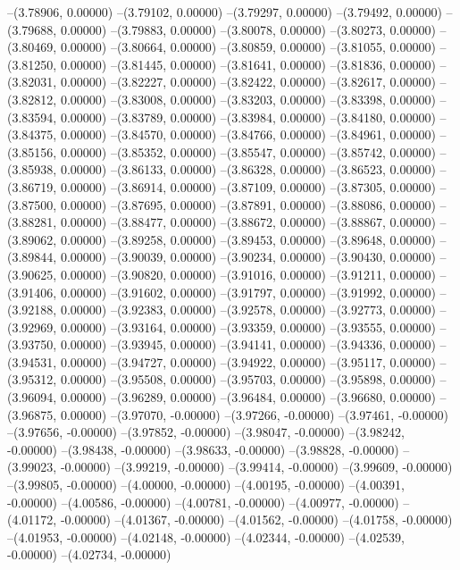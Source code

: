 --(3.78906, 0.00000)
--(3.79102, 0.00000)
--(3.79297, 0.00000)
--(3.79492, 0.00000)
--(3.79688, 0.00000)
--(3.79883, 0.00000)
--(3.80078, 0.00000)
--(3.80273, 0.00000)
--(3.80469, 0.00000)
--(3.80664, 0.00000)
--(3.80859, 0.00000)
--(3.81055, 0.00000)
--(3.81250, 0.00000)
--(3.81445, 0.00000)
--(3.81641, 0.00000)
--(3.81836, 0.00000)
--(3.82031, 0.00000)
--(3.82227, 0.00000)
--(3.82422, 0.00000)
--(3.82617, 0.00000)
--(3.82812, 0.00000)
--(3.83008, 0.00000)
--(3.83203, 0.00000)
--(3.83398, 0.00000)
--(3.83594, 0.00000)
--(3.83789, 0.00000)
--(3.83984, 0.00000)
--(3.84180, 0.00000)
--(3.84375, 0.00000)
--(3.84570, 0.00000)
--(3.84766, 0.00000)
--(3.84961, 0.00000)
--(3.85156, 0.00000)
--(3.85352, 0.00000)
--(3.85547, 0.00000)
--(3.85742, 0.00000)
--(3.85938, 0.00000)
--(3.86133, 0.00000)
--(3.86328, 0.00000)
--(3.86523, 0.00000)
--(3.86719, 0.00000)
--(3.86914, 0.00000)
--(3.87109, 0.00000)
--(3.87305, 0.00000)
--(3.87500, 0.00000)
--(3.87695, 0.00000)
--(3.87891, 0.00000)
--(3.88086, 0.00000)
--(3.88281, 0.00000)
--(3.88477, 0.00000)
--(3.88672, 0.00000)
--(3.88867, 0.00000)
--(3.89062, 0.00000)
--(3.89258, 0.00000)
--(3.89453, 0.00000)
--(3.89648, 0.00000)
--(3.89844, 0.00000)
--(3.90039, 0.00000)
--(3.90234, 0.00000)
--(3.90430, 0.00000)
--(3.90625, 0.00000)
--(3.90820, 0.00000)
--(3.91016, 0.00000)
--(3.91211, 0.00000)
--(3.91406, 0.00000)
--(3.91602, 0.00000)
--(3.91797, 0.00000)
--(3.91992, 0.00000)
--(3.92188, 0.00000)
--(3.92383, 0.00000)
--(3.92578, 0.00000)
--(3.92773, 0.00000)
--(3.92969, 0.00000)
--(3.93164, 0.00000)
--(3.93359, 0.00000)
--(3.93555, 0.00000)
--(3.93750, 0.00000)
--(3.93945, 0.00000)
--(3.94141, 0.00000)
--(3.94336, 0.00000)
--(3.94531, 0.00000)
--(3.94727, 0.00000)
--(3.94922, 0.00000)
--(3.95117, 0.00000)
--(3.95312, 0.00000)
--(3.95508, 0.00000)
--(3.95703, 0.00000)
--(3.95898, 0.00000)
--(3.96094, 0.00000)
--(3.96289, 0.00000)
--(3.96484, 0.00000)
--(3.96680, 0.00000)
--(3.96875, 0.00000)
--(3.97070, -0.00000)
--(3.97266, -0.00000)
--(3.97461, -0.00000)
--(3.97656, -0.00000)
--(3.97852, -0.00000)
--(3.98047, -0.00000)
--(3.98242, -0.00000)
--(3.98438, -0.00000)
--(3.98633, -0.00000)
--(3.98828, -0.00000)
--(3.99023, -0.00000)
--(3.99219, -0.00000)
--(3.99414, -0.00000)
--(3.99609, -0.00000)
--(3.99805, -0.00000)
--(4.00000, -0.00000)
--(4.00195, -0.00000)
--(4.00391, -0.00000)
--(4.00586, -0.00000)
--(4.00781, -0.00000)
--(4.00977, -0.00000)
--(4.01172, -0.00000)
--(4.01367, -0.00000)
--(4.01562, -0.00000)
--(4.01758, -0.00000)
--(4.01953, -0.00000)
--(4.02148, -0.00000)
--(4.02344, -0.00000)
--(4.02539, -0.00000)
--(4.02734, -0.00000)
